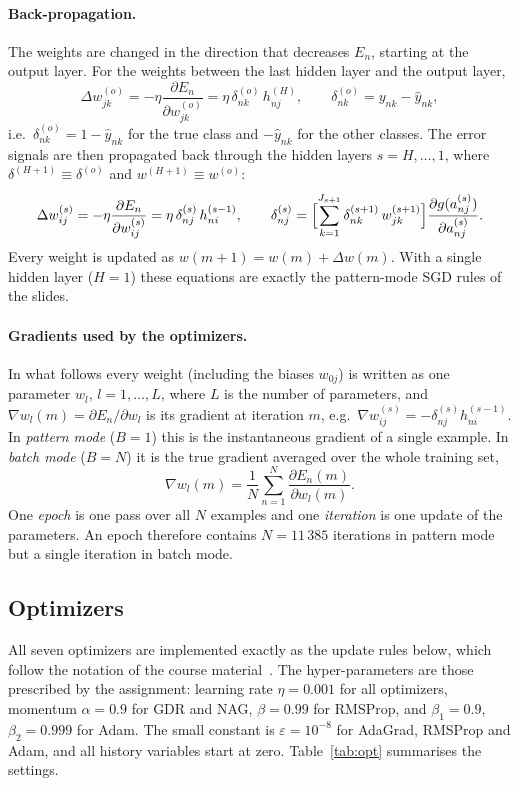 \documentclass[runningheads]{llncs}
\begin{document}
\paragraph{Back-propagation.} The weights are changed in the direction that decreases $E_n$,
starting at the output layer. For the weights between the last hidden layer and the output layer,
\begin{equation}
\Delta w^{(o)}_{jk}=-\eta\frac{\partial E_n}{\partial w^{(o)}_{jk}}=\eta\,\delta^{(o)}_{nk}\,h^{(H)}_{nj},
\qquad \delta^{(o)}_{nk}=y_{nk}-\hat{y}_{nk},
\end{equation}
i.e.\ $\delta^{(o)}_{nk}=1-\hat{y}_{nk}$ for the true class and $-\hat{y}_{nk}$ for the other
classes.
The error signals are then propagated back through the hidden layers $s=H,\dots,1$, where
$\delta^{(H+1)}\equiv\delta^{(o)}$ and $w^{(H+1)}\equiv w^{(o)}$:
\begin{equation}
\Delta w^{(s)}_{ij}=-\eta\frac{\partial E_n}{\partial w^{(s)}_{ij}}=\eta\,\delta^{(s)}_{nj}\,h^{(s-1)}_{ni},
\qquad
\delta^{(s)}_{nj}=\Bigl[\sum_{k=1}^{J_{s+1}}\delta^{(s+1)}_{nk}\,w^{(s+1)}_{jk}\Bigr]
\frac{\partial g(a^{(s)}_{nj})}{\partial a^{(s)}_{nj}} .
\end{equation}
Every weight is updated as $w(m+1)=w(m)+\Delta w(m)$. With a single hidden layer ($H=1$) these
equations are exactly the pattern-mode SGD rules of the slides.

\paragraph{Gradients used by the optimizers.} In what follows every weight (including the biases
$w_{0j}$) is written as one parameter $w_l$, $l=1,\dots,L$, where $L$ is the number of parameters,
and $\nabla w_l(m)=\partial E_n/\partial w_l$ is its gradient at iteration $m$, e.g.\
$\nabla w^{(s)}_{ij}=-\delta^{(s)}_{nj}h^{(s-1)}_{ni}$. In \emph{pattern mode} ($B=1$) this is the
instantaneous gradient of a single example. In \emph{batch mode} ($B=N$) it is the true gradient
averaged over the whole training set,
\begin{equation}
\nabla w_l(m)=\frac{1}{N}\sum_{n=1}^{N}\frac{\partial E_n(m)}{\partial w_l(m)} .
\end{equation}
One \emph{epoch} is one pass over all $N$ examples and one \emph{iteration} is one update of the
parameters. An epoch therefore contains $N=11\,385$ iterations in pattern mode but a single
iteration in batch mode.

\subsection{Optimizers}
All seven optimizers are implemented exactly as the update rules below, which follow the notation of
the course material~\cite{kumar2013,aggarwal2018}. The hyper-parameters are those prescribed by the
assignment: learning rate $\eta=0.001$ for all optimizers, momentum $\alpha=0.9$ for GDR and NAG,
$\beta=0.99$ for RMSProp, and $\beta_1=0.9$, $\beta_2=0.999$ for Adam. The small constant is
$\varepsilon=10^{-8}$ for AdaGrad, RMSProp and Adam, and all history variables start at zero.
Table~\ref{tab:opt} summarises the settings.
\end{document}
